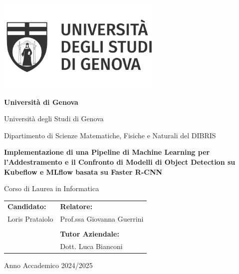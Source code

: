 \begin{titlepage}
    \centering

    \vspace*{2cm} 
    \includegraphics[width=0.6\textwidth]{images/universita-degli-studi-di-genova-logo-vector.png} %
    \vspace{1cm}

    {\Large \textbf{Università di Genova}\par}
    \vspace{0.5cm}

    {\normalsize Università degli Studi di Genova\par}
    {\normalsize Dipartimento di Scienze Matematiche, Fisiche e Naturali del DIBRIS\par}
    \vspace{1cm}

    {\Large \textbf{Implementazione di una Pipeline di Machine Learning per l'Addestramento e il Confronto di Modelli di Object Detection su Kubeflow e MLflow basata su Faster R-CNN}\par}
    \vspace{1cm}

    {\normalsize Corso di Laurea in Informatica\par}
    \vspace{2cm}

    \begin{tabular}{ll}
        \textbf{Candidato:} & \hspace{5cm}\textbf{Relatore:} \\
        Loris Prataiolo & \hspace{5cm}Prof.ssa Giovanna Guerrini \\
        & \\
        & \hspace{5cm}\textbf{Tutor Aziendale:} \\
        & \hspace{5cm}Dott. Luca Bianconi \\
    \end{tabular}
    \vspace{3cm}

    {\normalsize Anno Accademico 2024/2025\par}

    \vspace*{\fill} 
\end{titlepage}